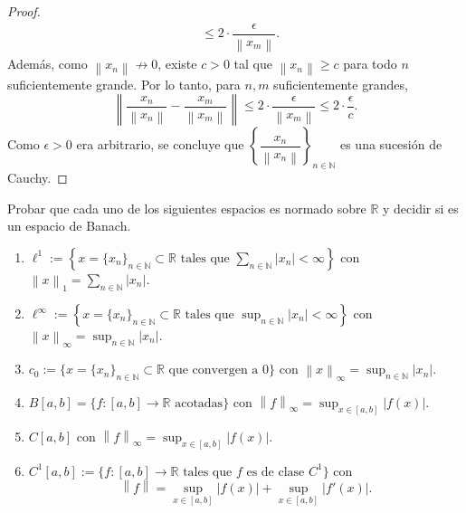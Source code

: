 \documentclass{article}
\theoremstyle{definition}
\newcommand{\R}{\mathbb{R}}
\newcommand{\N}{\mathbb{N}}
\newcommand{\norm}[1]{\left\lVert #1 \right\rVert}       %
\newenvironment{ejercicio}[1]{\begin{trivlist}
\item[\hskip \labelsep {\bfseries Ejercicio}\hskip \labelsep {\bfseries #1.}]}{\end{trivlist}}
\begin{document}
\begin{proof}
\begin{align*}
                                                                   & \leq 2 \cdot \dfrac{\epsilon}{\norm{x_m}}.
    \end{align*}
    Además, como \( \norm{x_n} \not\to 0 \), existe \( c > 0 \) tal que \( \norm{x_n} \geq c \) para todo \( n \) suficientemente grande. Por lo tanto, para \( n,m \) suficientemente grandes,
    \[
        \norm{ \dfrac{x_n}{\norm{x_n}} - \dfrac{x_m}{\norm{x_m}} } \leq 2 \cdot \dfrac{\epsilon}{\norm{x_m}} \leq 2 \cdot \dfrac{\epsilon}{c}.
    \]
    Como \( \epsilon > 0 \) era arbitrario, se concluye que \( {\left \{ \dfrac{x_n}{\norm{x_n}} \right \}}_{n\in\N} \) es una sucesión de Cauchy.
\end{proof}

\vspace{0.5cm}

\begin{ejercicio}{5}
    Probar que cada uno de los siguientes espacios es normado sobre \( \R \) y decidir si es un espacio de Banach.
    \begin{enumerate}
        \item \(\ell^1:=\left \{ x={\{x_n\}}_{n\in\N}\subset\R \text{ tales que } \sum_{n\in\N}|x_n|<\infty\right \} \) con \(\norm{x}_1=\sum_{n\in\N}|x_n|\).
        \item \(\ell^\infty:=\left \{ x={\{x_n\}}_{n\in\N}\subset\R \text{ tales que } \sup_{n\in\N}|x_n|<\infty\right \} \) con \(\norm{x}_\infty=\sup_{n\in\N}|x_n|\).
        \item \(c_0:=\{x={\{x_n\}}_{n\in\N}\subset\R \text{ que convergen a } 0\} \) con \(\norm{x}_\infty=\sup_{n\in\N}|x_n|\).
        \item \(B[a,b] = \{ f : [a,b]\to\R \text{ acotadas} \} \) con \( \norm{f}_\infty = \sup_{x\in[a,b]} |f(x)| \).
        \item \(C[a,b]\) con \(\norm{f}_\infty=\sup_{x\in[a,b]}|f(x)|\).
        \item \( C^1[a,b]:=\{f:[a,b]\to\R \text{ tales que } f \text{ es de clase } C^1\} \) con
              \[
                  \norm{f}=\sup_{x\in[a,b]}|f(x)|+\sup_{x\in[a,b]}|f'(x)|.
              \]
    \end{enumerate}
\end{ejercicio}
\end{document}
